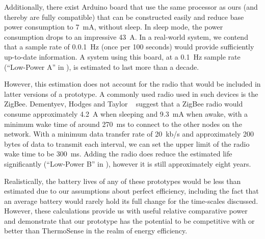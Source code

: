 \documentclass[../thesis/thesis.tex]{subfiles}
\begin{document}
Additionally, there exist Arduino board that use the same processor as ours (and thereby are fully compatible) that can be constructed easily and reduce base power consumption to 7~mA, without sleep. In sleep mode, the power consumption drops to an impressive 43~\textmu A. In a real-world system, we contend that a sample rate of 0.0.1~Hz (once per 100 seconds) would provide sufficiently up-to-date information. A system using this board, at a 0.1~Hz sample rate (``Low-Power A'' in ), is estimated to last more than a decade.

However, this estimation does not account for the radio that would be included in latter versions of a prototype. A commonly used radio used in such devices is the ZigBee. Dementyev, Hodges and Taylor \etal~\cite{dementyev2013power} suggest that a ZigBee radio would consume approximately 4.2~\textmu A when sleeping and 9.3~mA when awake, with a minimum wake time of around 270~ms to connect to the other nodes on the network. With a minimum data transfer rate of 20~kb/s and approximately 200 bytes of data to transmit each interval, we can set the upper limit of the radio wake time to be 300~ms. Adding the radio does reduce the estimated life significantly (``Low-Power B'' in ), however it is still approximately eight years.

Realistically, the battery lives of any of these prototypes would be less than estimated due to our assumptions about perfect efficiency, including the fact that an average battery would rarely hold its full change for the time-scales discussed. However, these calculations provide us with useful relative comparative power and demonstrate that our prototype has the potential to be competitive with or better than ThermoSense in the realm of energy efficiency.

\end{document}
